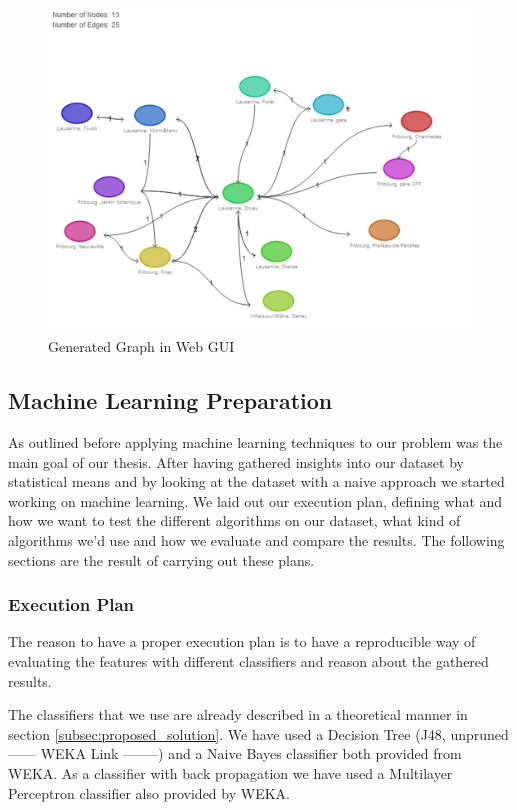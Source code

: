 \begin{figure}[!ht]
	\centering
	\includegraphics[width=1.0\textwidth]{images/web-gui}
	\caption{Generated Graph in Web GUI}
	\label{figure:web_gui_graph}
\end{figure}

\subsection{Machine Learning Preparation}
\label{subsec:machine_learning_results}
As outlined before applying machine learning techniques to our problem was the main goal of our thesis. After having gathered insights into our dataset by statistical means and by looking at the dataset with a naive approach we started working on machine learning. We laid out our execution plan, defining what and how we want to test the different algorithms on our dataset, what kind of algorithms we'd use and how we evaluate and compare the results. The following sections are the result of carrying out these plans.

\subsubsection{Execution Plan}
The reason to have a proper execution plan is to have a reproducible way of evaluating the features with different classifiers and reason about the gathered results. 

The classifiers that we use are already described in a theoretical manner in section \ref{subsec:proposed_solution}. We have used a Decision Tree (J48, unpruned ------ WEKA Link --------) and a Naive Bayes classifier both provided from WEKA. As a classifier with back propagation we have used a Multilayer Perceptron classifier also provided by WEKA.

